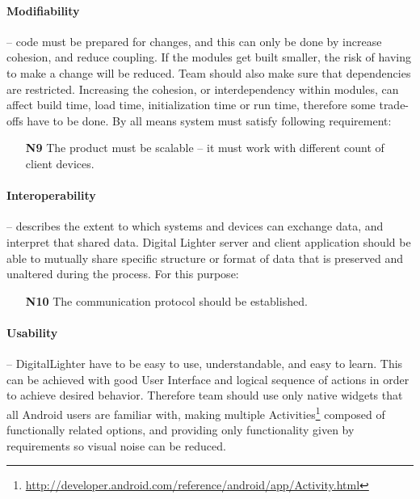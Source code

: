 \paragraph{Modifiability}
-- code must be prepared for changes, and this can only be done by increase cohesion, and reduce coupling. 
If the modules get built smaller, the risk of having to make a change will be reduced. 
Team should also make sure that dependencies are restricted. 
Increasing the cohesion, or interdependency within modules, can affect build time, load time, initialization time or run time, therefore some trade-offs have to be done. By all means system must satisfy following requirement:
\begin{itemize}
\item[\textbf{N9}] \label{req_N9} The product must be scalable -- it must work with  different count of client devices.
\end{itemize}

\paragraph{Interoperability}
-- describes the extent to which systems and devices can exchange data, and interpret that shared data. Digital Lighter server and client application should be able to mutually share specific structure or format of data that is preserved and unaltered during the process. For this purpose:
\begin{itemize}
\item[\textbf{N10}] \label{req_N10} The communication protocol should be established.
\end{itemize}

\paragraph{Usability} -- DigitalLighter have to be easy to use, understandable, and easy to learn. This can be achieved with good User Interface and logical sequence of actions in order to achieve desired behavior. Therefore team should use only native widgets that all Android users are familiar with, making multiple Activities\footnote{\url{http://developer.android.com/reference/android/app/Activity.html}} composed of functionally related options, and providing only functionality given by requirements so visual noise can be reduced. 

